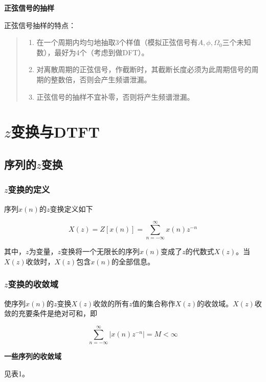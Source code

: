 \documentclass[cn, hazy, blue, normal, 12pt]{elegantnote}
\begin{document}
\textbf{正弦信号的抽样}

正弦信号抽样的特点：

\begin{quote}
\begin{enumerate}
    \item 在一个周期内均匀地抽取3个样值（模拟正弦信号有$A, \phi, \Omega_0$三个未知数），最好为4个（考虑到做DFT）。
    \item 对离散周期的正弦信号，作截断时，其截断长度必须为此周期信号的周期的整数倍，否则会产生频谱泄漏。
    \item 正弦信号的抽样不宜补零，否则将产生频谱泄漏。
\end{enumerate}
\end{quote}

\section{$z$变换与DTFT}

\subsection{序列的$z$变换}

\subsubsection{$z$变换的定义}

序列$x(n)$的$z$变换定义如下

\begin{equation}
        X(z)=Z[x(n)]=\sum_{n=-\infty}^{\infty}{x(n)z^{-n}}
\end{equation}

其中，$z$为变量，$z$变换将一个无限长的序列$x(n)$变成了$z$的代数式$X(z)$。当$X(z)$收敛时，$X(z)$包含$x(n)$的全部信息。

\subsubsection{$z$变换的收敛域}

使序列$x(n)$的$z$变换$X(z)$收敛的所有$z$值的集合称作$X(z)$的收敛域。$X(z)$收敛的充要条件是绝对可和，即

\begin{equation}
        \sum_{n=-\infty}^{\infty}|{x(n)z^{-n}}|=M<\infty
\end{equation}

\textbf{一些序列的收敛域}

见表1。
\end{document}
